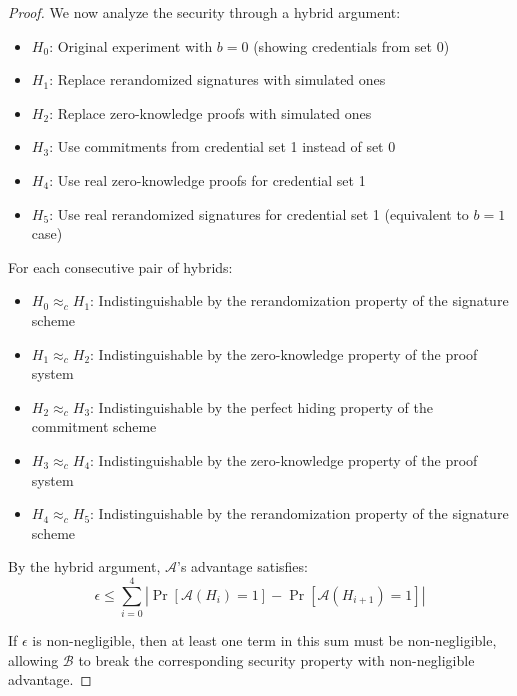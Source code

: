 \begin{proof}
\noindent We now analyze the security through a hybrid argument:

\begin{itemize}
    \item $H_0$: Original experiment with $b=0$ (showing credentials from set 0)
    
    \item $H_1$: Replace rerandomized signatures with simulated ones
    
    \item $H_2$: Replace zero-knowledge proofs with simulated ones
    
    \item $H_3$: Use commitments from credential set 1 instead of set 0
    
    \item $H_4$: Use real zero-knowledge proofs for credential set 1
    
    \item $H_5$: Use real rerandomized signatures for credential set 1 (equivalent to $b=1$ case)
\end{itemize}

\noindent For each consecutive pair of hybrids:

\begin{itemize}
    \item $H_0 \approx_c H_1$: Indistinguishable by the rerandomization property of the signature scheme
    
    \item $H_1 \approx_c H_2$: Indistinguishable by the zero-knowledge property of the proof system
    
    \item $H_2 \approx_c H_3$: Indistinguishable by the perfect hiding property of the commitment scheme
    
    \item $H_3 \approx_c H_4$: Indistinguishable by the zero-knowledge property of the proof system
    
    \item $H_4 \approx_c H_5$: Indistinguishable by the rerandomization property of the signature scheme
\end{itemize}

\noindent By the hybrid argument, $\mathcal{A}$'s advantage satisfies:
\[
\epsilon \leq \sum_{i=0}^{4} |\Pr[\mathcal{A}(H_i) = 1] - \Pr[\mathcal{A}(H_{i+1}) = 1]|
\]

\noindent If $\epsilon$ is non-negligible, then at least one term in this sum must be non-negligible, allowing $\mathcal{B}$ to break the corresponding security property with non-negligible advantage.


\end{proof}
